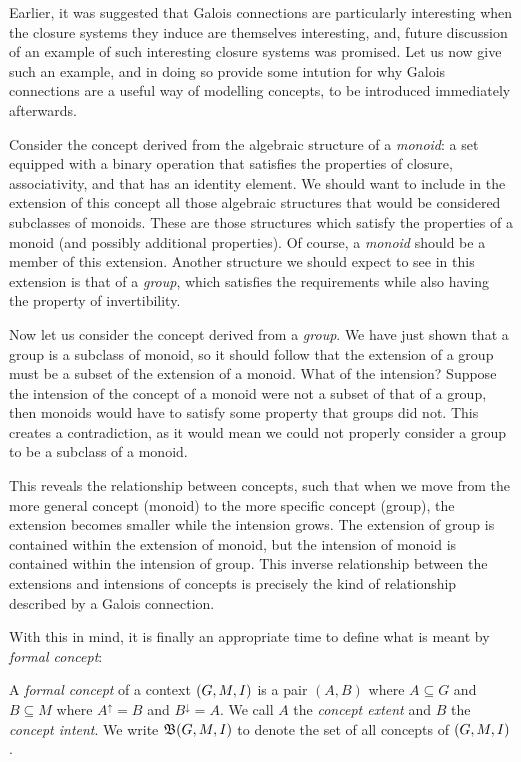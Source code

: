 Earlier, it was suggested that Galois connections are particularly interesting
when the closure systems they induce are themselves interesting, and, future
discussion of an example of such interesting closure systems was promised. Let us
now give such an example, and in doing so provide some intution for why Galois
connections are a useful way of modelling concepts, to be introduced immediately
afterwards.

Consider the concept derived from the algebraic structure of a \textit{monoid}: a
set equipped with a binary operation that satisfies the properties of closure,
associativity, and that has an identity element. We should want to include in
the extension of this concept all those algebraic structures that would be
considered subclasses of monoids. These are those structures which satisfy the properties
of a monoid (and possibly additional properties). Of course, a \textit{monoid}
should be a member of this extension. Another structure we should expect to see in
this extension is that of a \textit{group}, which satisfies the requirements while
also having the property of invertibility.

Now let us consider the concept derived from a \textit{group}. We have just shown
that a group is a subclass of monoid, so it should follow that the extension of
a group must be a subset of the extension of a monoid. What of the intension?
Suppose the intension of the concept of a monoid were not a subset of that of a
group, then monoids would have to satisfy some property that groups did not.
This creates a contradiction, as it would mean we could not properly consider a group
to be a subclass of a monoid.

This reveals the relationship between concepts, such that when we move from the
more general concept (monoid) to the more specific concept (group), the extension
becomes smaller while the intension grows. The extension of group is contained
within the extension of monoid, but the intension of monoid is contained within the
intension of group. This inverse relationship between the extensions and
intensions of concepts is precisely the kind of relationship described by a
Galois connection.

With this in mind, it is finally an appropriate time to define what is meant by \textit{formal
	concept}:

\begin{definition}
	  \label{definition:formal-concept}
	A \emph{formal concept} of a context $(G,M,\mathrel{I})$ is a pair $(A,B)$ where
	$A \subseteq G$ and $B\subseteq M$ where $A^{\uparrow}= B$ and
	$B^{\downarrow}= A$. We call $A$ the \emph{concept extent} and $B$ the \emph{concept
		intent}. We write ${\mathfrak B} (G,M,\mathrel{I})$ to denote the set of all concepts of $(G,M,\mathrel{I})$.
\end{definition}

